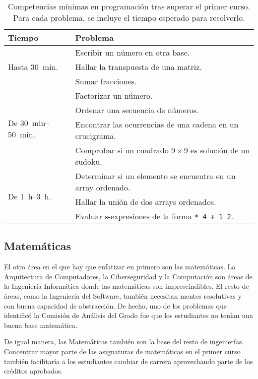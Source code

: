 \begin{table}[h]
    \centering
    \begin{tabular}{ll}
        \textbf{Tiempo} & \textbf{Problema} \\
        \hline
        \multirow{3}{*}{Hasta \SI{30}{min}.}
        & Escribir un número en otra base. \\
        & Hallar la transpuesta de una matriz. \\
        & Sumar fracciones. \\
        \hline
        \multirow{4}{*}{De \SIrange{30}{50}{min}.}
        & Factorizar un número. \\ 
        & Ordenar una secuencia de números. \\
        & Encontrar las ocurrencias de una cadena en un crucigrama. \\
        & Comprobar si un cuadrado $9\times 9$ es solución de un sudoku. \\
        \hline
        \multirow{3}{*}{De \SIrange{1}{3}{h}.}
        & Determinar si un elemento se encuentra en un array ordenado. \\
        & Hallar la unión de dos arrays ordenados. \\
        & Evaluar s-expresiones de la forma \lstinline!* 4 + 1 2!.
    \end{tabular}
    \caption{
        Competencias mínimas en programación tras superar el primer curso.
        Para cada problema, se incluye el tiempo esperado para resolverlo.
    }
    \label{tab:first-course-programming-examples}
\end{table}

\subsection{Matemáticas}

El otro área en el que hay que enfatizar en primero son las matemáticas.
La Arquitectura de Computadores, la Ciberseguridad y la Computación
son áreas de la Ingeniería Informática donde
las matemáticas son imprescindibles.
El resto de áreas, como la Ingeniería del Software,
también necesitan mentes resolutivas y con buena capacidad de abstracción.
De hecho, uno de los problemas que
identificó la Comisión de Análisis del Grado
fue que los estudiantes no tenían una buena base matemática.

De igual manera,
las Matemáticas también son la base del resto de ingenierías.
Concentrar mayor parte de las asignaturas de matemáticas en el primer curso
también facilitaría a los estudiantes cambiar de carrera
aprovechando parte de los créditos aprobados.

